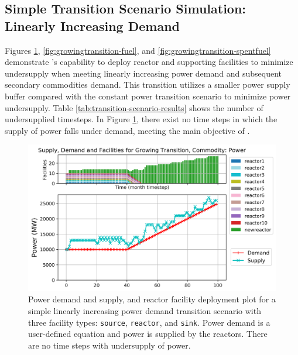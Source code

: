     \subsection{Simple Transition Scenario Simulation: Linearly Increasing Demand}

    Figures \ref{fig:growingtransition-power}, \ref{fig:growingtransition-fuel},
    and \ref{fig:growingtransition-spentfuel} demonstrate \deploy's capability 
    to deploy reactor and supporting facilities to minimize undersupply 
    when meeting linearly increasing power demand and subsequent secondary 
    commodities demand. 
    This transition utilizes a smaller power supply buffer compared with the constant 
    power transition scenario to minimize power undersupply.
    Table \ref{tab:transition-scenario-results} shows the number of 
    undersupplied timesteps. 
    In Figure \ref{fig:growingtransition-power}, there exist no time steps 
    in which the supply of power falls under demand, meeting the main 
    objective of \deploy. 
    
    \begin{figure}[]
        \centering
        \includegraphics[width=0.9\linewidth]{figures/growingtransition-power.png} 
            \caption{Power demand and supply, and reactor facility deployment plot for  
            a simple linearly increasing power demand transition scenario with 
            three facility types: \texttt{source}, \texttt{reactor}, and \texttt{sink}.
            Power demand is a user-defined equation and power is supplied by the reactors.
            There are no time steps with undersupply of power.}
            \label{fig:growingtransition-power}
    \end{figure}
    
